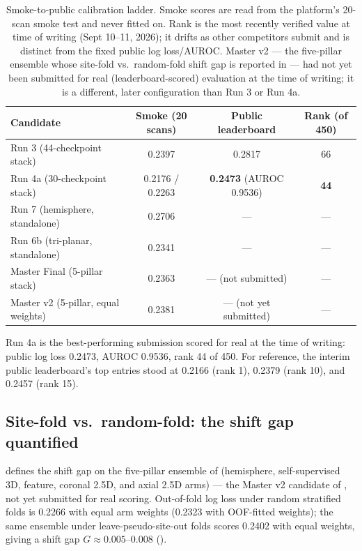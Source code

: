 \documentclass[10pt]{article}
\newcommand{\shiftgap}{\ensuremath{G}}
\begin{document}
\begin{table}[t]
\centering
\small
\caption{Smoke-to-public calibration ladder. Smoke scores are read from the platform's 20-scan smoke test and never fitted on. Rank is the most recently verified value at time of writing (Sept 10--11, 2026); it drifts as other competitors submit and is distinct from the fixed public log loss/AUROC. Master v2 --- the five-pillar ensemble whose site-fold vs.\ random-fold shift gap is reported in  --- had not yet been submitted for real (leaderboard-scored) evaluation at the time of writing; it is a different, later configuration than Run 3 or Run 4a.}
\label{tab:ladder}
\begin{tabular}{@{}lccc@{}}
\toprule
\textbf{Candidate} & \textbf{Smoke (20 scans)} & \textbf{Public leaderboard} & \textbf{Rank (of 450)} \\
\midrule
Run 3 (44-checkpoint stack) & 0.2397 & 0.2817 & 66 \\
Run 4a (30-checkpoint stack) & 0.2176 / 0.2263 & \textbf{0.2473} (AUROC 0.9536) & \textbf{44} \\
Run 7 (hemisphere, standalone) & 0.2706 & --- & --- \\
Run 6b (tri-planar, standalone) & 0.2341 & --- & --- \\
Master Final (5-pillar stack) & 0.2363 & --- (not submitted) & --- \\
Master v2 (5-pillar, equal weights) & 0.2381 & --- (not yet submitted) & --- \\
\bottomrule
\end{tabular}
\end{table}

Run 4a is the best-performing submission scored for real at the time of writing: public log loss 0.2473, AUROC 0.9536, rank 44 of 450. For reference, the interim public leaderboard's top entries stood at 0.2166 (rank 1), 0.2379 (rank 10), and 0.2457 (rank 15).

\subsection{Site-fold vs.\ random-fold: the shift gap quantified}
\label{sec:shiftgap-results}

 defines the shift gap on the five-pillar ensemble of  (hemisphere, self-supervised 3D, feature, coronal 2.5D, and axial 2.5D arms) --- the Master v2 candidate of , not yet submitted for real scoring. Out-of-fold log loss under random stratified folds is 0.2266 with equal arm weights (0.2323 with OOF-fitted weights); the same ensemble under leave-pseudo-site-out folds scores 0.2402 with equal weights, giving a shift gap $\shiftgap \approx 0.005$--$0.008$ ().
\end{document}
